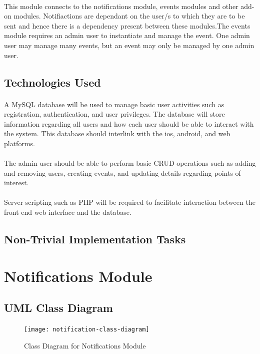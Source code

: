 \documentclass{article}
\begin{document}
\paragraph{}This module connects to the notifications module, events modules and other add-on modules. Notifiactions are dependant on the user/s to which they are to be sent and hence there is a dependency present between these modules.The events module requires an admin user to instantiate and manage the event. One admin user may manage many events, but an event may only be managed by one admin user. 

\subsection{Technologies Used}
\paragraph{}A MySQL database will be used to manage basic user activities such as registration, authentication, and user privileges. The database will store information regarding all users and how each user should be able to interact with the system. This database should interlink with the ios, android, and web platforms.

\paragraph{}The admin user should be able to perform basic CRUD operations such as adding and removing users, creating events, and updating details regarding points of interest. 

\paragraph{}Server scripting such as PHP will be required to facilitate interaction between the front end web interface and the database.

\subsection{Non-Trivial Implementation Tasks}

\section{Notifications Module}
\subsection{UML Class Diagram}
\begin{figure}[H]
\texttt{[image: notification-class-diagram]}
\caption{Class Diagram for Notifications Module}
\end{figure}
\end{document}
